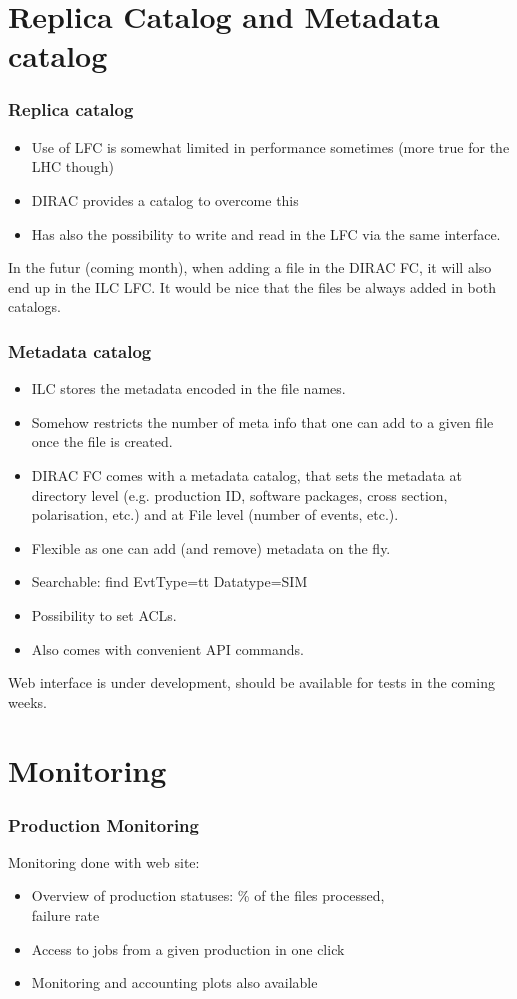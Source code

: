 \documentclass{beamer}
\begin{document}
\section{Replica Catalog and Metadata catalog}
\begin{frame}
\frametitle{Replica catalog} 
\begin{itemize}
\item Use of LFC is somewhat \alert{limited in performance sometimes} (more true for the LHC though)
\item \alert{DIRAC provides a catalog} to overcome this
\item Has also the possibility to \alert{write and read in the LFC via the same interface}.
\end{itemize}
In the futur (coming month), when adding a file in the DIRAC FC, it will also end up in the ILC LFC. It would be nice that the files be always added in both catalogs.
 \end{frame}
\begin{frame}
\frametitle{Metadata catalog}
\begin{itemize}
\item ILC stores the metadata encoded in the file names.
\item Somehow restricts the number of meta info that one can add to a given file once the file is created.
\item DIRAC FC comes with a metadata catalog, that sets the \alert{metadata at directory level} (e.g. production ID, software packages, cross section, polarisation, etc.) and at File level (number of events, etc.).
\item Flexible as one can add (and remove) metadata on the fly.
\item Searchable: find EvtType=tt Datatype=SIM
\item Possibility to set ACLs.
\item Also comes with convenient API commands.
\end{itemize} 
Web interface is under development, should be available for tests in the coming weeks.
 \end{frame}
\section{Monitoring}
\begin{frame}
\frametitle{Production Monitoring}
Monitoring done with web site: 
\begin{itemize}
\item Overview of production statuses: \% of the files processed,\\ failure rate
\item Access to jobs from a given production in one click
\item Monitoring and accounting plots also available
\end{itemize}
\end{frame}
\end{document}
